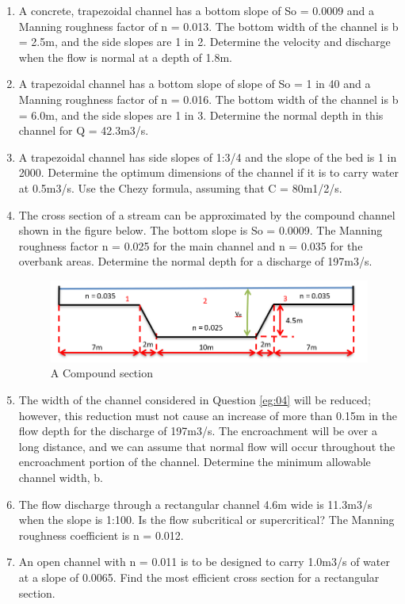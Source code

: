 \documentclass[a4paper, 12pt, british]{article} %
\numberwithin{equation}{section}
\numberwithin{figure}{section}
\numberwithin{table}{section}
\begin{document}
\begin{enumerate}
	\item	A concrete, trapezoidal channel has a bottom slope of So = 0.0009 and a Manning roughness factor of n = 0.013. The bottom width of the channel is b = 2.5m, and the side slopes are 1 in 2. Determine the velocity and discharge when the flow is normal at a depth of 1.8m. 
	
	\item	A trapezoidal channel has a bottom slope of slope of So = 1 in 40 and a Manning roughness factor of n = 0.016. The bottom width of the channel is b = 6.0m, and the side slopes are 1 in 3. Determine the normal depth in this channel for Q = 42.3m3/s.  
	
	\item	A trapezoidal channel has side slopes of 1:3/4 and the slope of the bed is 1 in 2000. Determine the optimum dimensions of the channel if it is to carry water at 0.5m3/s. Use the Chezy formula, assuming that C = 80m1/2/s.
	
	\item \label{eg:04}	The cross section of a stream can be approximated by the compound channel shown in the figure below. The bottom slope is So = 0.0009. The Manning roughness factor n = 0.025 for the main channel and n = 0.035 for the overbank areas. Determine the normal depth for a discharge of 197m3/s. 
		\begin{figure}[H]
		\centering
		\includegraphics[scale=0.5]{./images/fig_eg4.png}
		\caption{A Compound section}
		\label{fig:eg4}
	\end{figure}
	\item	The width of the channel considered in Question \ref{eg:04} will be reduced; however, this reduction must not cause an increase of more than 0.15m in the flow depth for the discharge of 197m3/s. The encroachment will be over a long distance, and we can assume that normal flow will occur throughout the encroachment portion of the channel. Determine the minimum allowable channel width, b. 
	
	\item	The flow discharge through a rectangular channel 4.6m wide is 11.3m3/s when the slope is 1:100. Is the flow subcritical or supercritical? The Manning roughness coefficient is n = 0.012.
	
	\item	An open channel with n = 0.011 is to be designed to carry 1.0m3/s of water at a slope of 0.0065. Find the most efficient cross section for a rectangular section. 
	
\end{enumerate}
\end{document}
